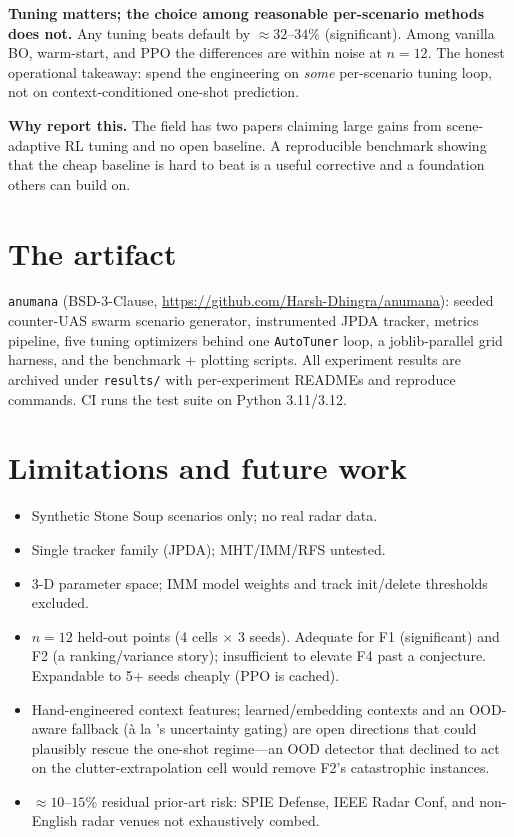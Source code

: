 \documentclass[11pt]{article}
\begin{document}
\textbf{Tuning matters; the choice among reasonable per-scenario methods
does not.} Any tuning beats default by ${\approx}32\text{--}34\%$
(significant). Among vanilla BO, warm-start, and PPO the differences are
within noise at $n{=}12$. The honest operational takeaway: spend the
engineering on \emph{some} per-scenario tuning loop, not on
context-conditioned one-shot prediction.

\textbf{Why report this.} The field has two papers claiming large gains
from scene-adaptive RL tuning and no open baseline. A reproducible
benchmark showing that the cheap baseline is hard to beat is a useful
corrective and a foundation others can build on.

\section{The artifact}
\label{sec:artifact}

\texttt{anumana} (BSD-3-Clause,
\url{https://github.com/Harsh-Dhingra/anumana}): seeded counter-UAS
swarm scenario generator, instrumented JPDA tracker, metrics pipeline,
five tuning optimizers behind one \texttt{AutoTuner} loop, a
joblib-parallel grid harness, and the benchmark + plotting scripts. All
experiment results are archived under \texttt{results/} with
per-experiment READMEs and reproduce commands. CI runs the test suite
on Python 3.11/3.12.

\section{Limitations and future work}

\begin{itemize}
\item Synthetic Stone Soup scenarios only; no real radar data.
\item Single tracker family (JPDA); MHT/IMM/RFS untested.
\item 3-D parameter space; IMM model weights and track init/delete
thresholds excluded.
\item $n{=}12$ held-out points (4 cells $\times$ 3 seeds). Adequate for
F1 (significant) and F2 (a ranking/variance story); insufficient to
elevate F4 past a conjecture. Expandable to 5+ seeds cheaply (PPO is
cached).
\item Hand-engineered context features; learned/embedding contexts and
an OOD-aware fallback (à la \citet{ott2022}'s uncertainty gating) are
open directions that could plausibly rescue the one-shot regime---an
OOD detector that declined to act on the clutter-extrapolation cell
would remove F2's catastrophic instances.
\item ${\approx}10\text{--}15\%$ residual prior-art risk: SPIE Defense,
IEEE Radar Conf, and non-English radar venues not exhaustively combed.
\end{itemize}
\end{document}
